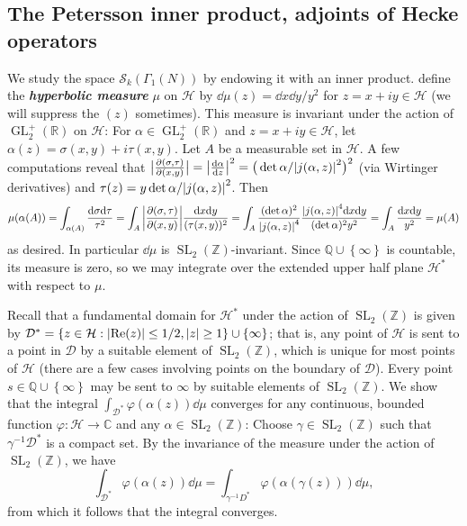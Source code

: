 \documentclass[10pt,leqno,twoside]{article}
\theoremstyle{plain}
\theoremstyle{definition}
\numberwithin{equation}{section}
\numberwithin{lem}{section}
\newcommand{\cbr}[1]{\left\{#1\right\}}
\newcommand{\textib}[1]{\textbf{\textit{#1\index{#1}}}} %
\DeclareMathOperator{\GL}{GL}
\DeclareMathOperator{\SL}{SL}
\newcommand{\slz}{\SL_2(\mathbb{Z})}
\newcommand{\glrp}{\GL_2^+(\mathbb{R})}
\begin{document}
\subsection{The Petersson inner product, adjoints of Hecke operators}
We study the space $\mathcal S_k(\varGamma_1(N))$ by endowing it with an inner product. define the \textib{hyperbolic measure} $\mu$ on $\mathcal H$ by $\dd\mu(z) = \dd x \dd y / y^2$ for $z = x+iy\in\mathcal H$ (we will suppress the $(z)$ sometimes). This measure is invariant under the action of $\glrp$ on $\mathcal H$: For $\alpha \in \glrp$ and $z=x+iy \in \mathcal H$, let $\alpha(z) = \sigma(x,y) + i\tau(x,y)$. Let $A$ be a measurable set in $\mathcal H$. A few computations reveal that $\big|\frac{\partial (\sigma,\tau)}{\partial(x,y)}\big| = \abs{\dv{\alpha}{z}}^2 = \big(\det\alpha/\abs{j(\alpha,z)}^2\big)^2$ (via Wirtinger derivatives) and $\tau(z) = y\det\alpha/\abs{j(\alpha,z)}^2$. Then \[\mu(\alpha(A)) = \int_{\alpha(A)} \frac{\dd\sigma\dd\tau}{\tau^2} = \int_{A}\bigg|\frac{\partial (\sigma,\tau)}{\partial(x,y)}\bigg|\frac{\dd x\dd y}{(\tau(x,y))^2} = \int_A \frac{(\det\alpha)^2}{\abs{j(\alpha,z)}^4}\frac{\abs{j(\alpha,z)}^4\dd x \dd y}{(\det\alpha)^2y^2} =\int_A \frac{\dd x \dd y}{y^2} = \mu(A)\]
as desired. In particular $\dd \mu$ is $\slz$-invariant. Since $\mathbb Q\cup\cbr{\infty}$ is countable, its measure is zero, so we may integrate over the extended upper half plane $\mathcal H^\ast$ with respect to $\mu$.

Recall that a fundamental domain for $\mathcal H^\ast$ under the action of $\slz$ is given by $\mathcal D^\ast = \cbr{z\in\mathcal H : \abs{\Re(z)}\leq 1/2,\abs{z}\geq 1}\cup\cbr{\infty}$; that is, any point of $\mathcal H$ is sent to a point in $\mathcal D$ by a suitable element of $\slz$, which is unique for most points of $\mathcal H$ (there are a few cases involving points on the boundary of $\mathcal D$). Every point $s\in\mathbb Q\cup\cbr{\infty}$ may be sent to $\infty$ by suitable elements of $\slz$. We show that the integral $\int_{\mathcal D^\ast} \varphi(\alpha(z))\dd \mu$ converges for any continuous, bounded function $\varphi\colon\mathcal H\to\mathbb C$ and any $\alpha\in\slz$: Choose $\gamma\in\slz$ such that $\gamma^{-1}\mathcal D^\ast$ is a compact set. By the invariance of the measure under the action of $\slz$, we have
\[\int_{\mathcal D^\ast} \varphi(\alpha(z))\dd \mu = \int_{\mathcal \gamma^{-1} D^\ast} \varphi(\alpha(\gamma(z)))\dd \mu, \] from which it follows that the integral converges.
\end{document}
